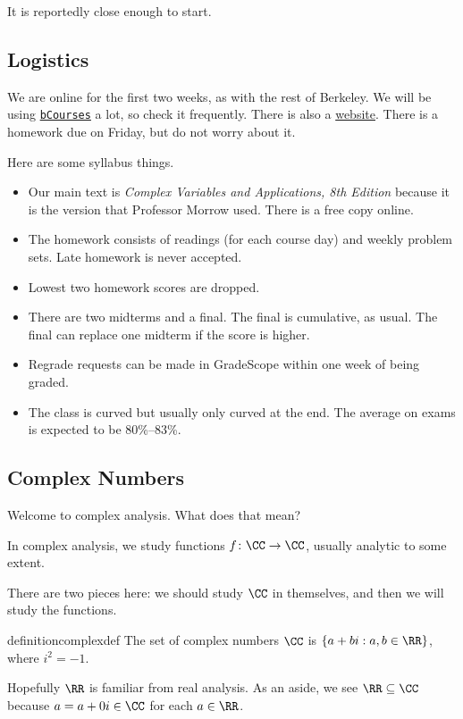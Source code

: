 \documentclass[../notes.tex]{subfiles}
\begin{document}

It is reportedly close enough to start.

\subsection{Logistics}
We are online for the first two weeks, as with the rest of Berkeley. We will be using \href{https://bcourses.berkeley.edu/courses/1511845}{\texttt{bCourses}} a lot, so check it frequently. There is also a \href{https://sites.google.com/view/ucb-math185-005-spring2022/home}{website}. There is a homework due on Friday, but do not worry about it.

Here are some syllabus things.
\begin{itemize}
	\item Our main text is \textit{Complex Variables and Applications, 8th Edition} because it is the version that Professor Morrow used. There is a free copy online.
	\item The homework consists of readings (for each course day) and weekly problem sets. Late homework is never accepted.
	\item Lowest two homework scores are dropped.
	\item There are two midterms and a final. The final is cumulative, as usual. The final can replace one midterm if the score is higher.
	\item Regrade requests can be made in GradeScope within one week of being graded.
	\item The class is curved but usually only curved at the end. The average on exams is expected to be 80\%--83\%.
\end{itemize}

\subsection{Complex Numbers}
Welcome to complex analysis. What does that mean?
\begin{idea}
	In complex analysis, we study functions $f\colon\CC\to\CC$, usually analytic to some extent.
\end{idea}
There are two pieces here: we should study $\CC$ in themselves, and then we will study the functions.
\begin{restatable}{definition}{complexdef}
	The set of complex numbers $\CC$ is $\{a+bi:a,b\in\RR\}$, where $i^2=-1$.
\end{restatable}
\noindent Hopefully $\RR$ is familiar from real analysis. As an aside, we see $\RR\subseteq\CC$ because $a=a+0i\in\CC$ for each $a\in\RR$.
\end{document}
